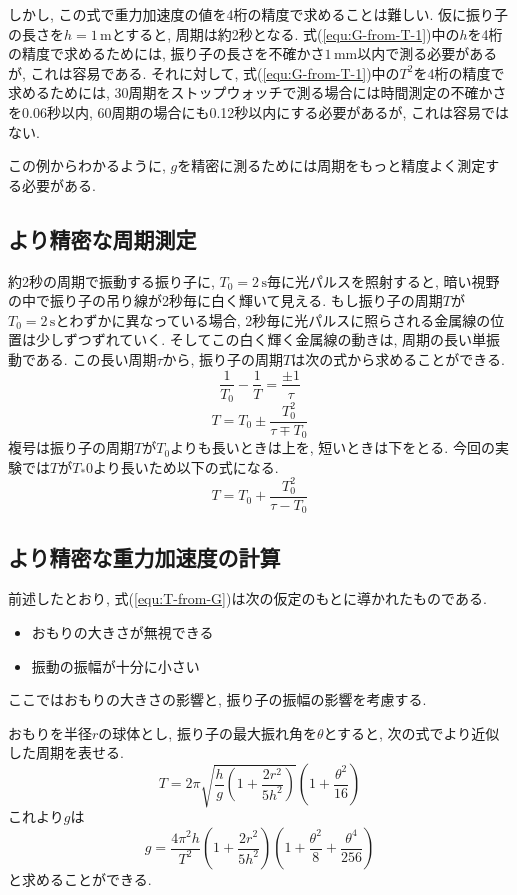 \documentclass{jarticle}
\begin{document}
しかし, この式で重力加速度の値を4桁の精度で求めることは難しい.
仮に振り子の長さを$h=1\,\mathrm{m}$とすると, 周期は約2秒となる.
式(\ref{equ:G-from-T-1})中の$h$を4桁の精度で求めるためには, 振り子の長さを不確かさ$1\,\mathrm{mm}$以内で測る必要があるが, これは容易である.
それに対して, 式(\ref{equ:G-from-T-1})中の$T^2$を4桁の精度で求めるためには, 30周期をストップウォッチで測る場合には時間測定の不確かさを0.06秒以内, 60周期の場合にも0.12秒以内にする必要があるが, これは容易ではない.

この例からわかるように, $g$を精密に測るためには周期をもっと精度よく測定する必要がある.


\subsection{より精密な周期測定}

約2秒の周期で振動する振り子に, $T_0=2\,\mathrm{s}$毎に光パルスを照射すると, 暗い視野の中で振り子の吊り線が2秒毎に白く輝いて見える.
もし振り子の周期$T$が$T_0=2\,\mathrm{s}$とわずかに異なっている場合, 2秒毎に光パルスに照らされる金属線の位置は少しずつずれていく.
そしてこの白く輝く金属線の動きは, 周期の長い単振動である.
この長い周期$\tau$から, 振り子の周期$T$は次の式から求めることができる.
\begin{equation}
  \frac{1}{T_0}-\frac{1}{T}=\frac{\pm1}{\tau}
\end{equation}
\begin{equation}
  T=T_0\pm\frac{T_0^2}{\tau\mp T_0}
\end{equation}
複号は振り子の周期$T$が$T_0$よりも長いときは上を, 短いときは下をとる.
今回の実験では$T$が$T_*0$より長いため以下の式になる.
\begin{equation}
  \label{eq:T-from-tau}
  T=T_0+\frac{T_0^2}{\tau-T_0}
\end{equation}


\subsection{より精密な重力加速度の計算}

前述したとおり, 式(\ref{equ:T-from-G})は次の仮定のもとに導かれたものである.
\begin{itemize}
  \item おもりの大きさが無視できる
  \item 振動の振幅が十分に小さい
\end{itemize}
ここではおもりの大きさの影響と, 振り子の振幅の影響を考慮する.

おもりを半径$r$の球体とし, 振り子の最大振れ角を$\theta$とすると, 次の式でより近似した周期を表せる.
\begin{equation}
  T=2\pi\sqrt{\frac{h}{g}\left(1+\frac{2r^2}{5h^2}\right)}\left(1+\frac{\theta^2}{16}\right)
\end{equation}
これより$g$は
\begin{equation}
  \label{eq:G-from-T-2}
  g=\frac{4\pi^2h}{T^2}\left(1+\frac{2r^2}{5h^2}\right)\left(1+\frac{\theta^2}{8}+\frac{\theta^4}{256}\right)
\end{equation}
と求めることができる.
\end{document}
